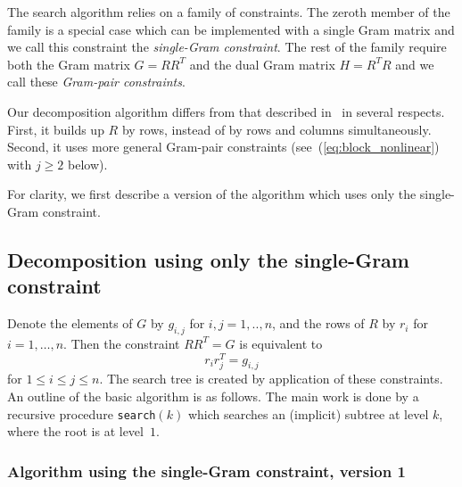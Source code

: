 \documentclass[11pt,a4paper]{article}
\begin{document}
The search algorithm relies on a family of constraints. The zeroth member
of the family is a special case which can be implemented with a single Gram
matrix and we call this constraint the \emph{single-Gram constraint}. The
rest of the family require both the Gram matrix $G=RR^T$ and the dual Gram
matrix $H=R^TR$ and we call these \emph{Gram-pair constraints}.

Our decomposition algorithm differs from that described in~\cite{Orrick05}
in several respects.  First, it builds up $R$ by rows, instead of by rows
and columns simultaneously.  Second, it uses more general Gram-pair
constraints (see~(\ref{eq:block_nonlinear}) with $j \ge 2$ below).

For clarity, we first describe a version of the algorithm which
uses only the single-Gram constraint.

\subsection{Decomposition using only the single-Gram constraint}
\label{subsec:linear}


Denote the elements of $G$ by $g_{i,j}$ for $i,j =1,..,n$,  
and the rows of $R$ by $r_i$ for $i=1,\ldots,n$. %
Then the constraint $RR^T = G$ is equivalent to
\begin{equation}
r_i r_j^T = g_{i,j}				\label{eq:gij_constraint}
\end{equation}
for $1 \le i \le j \le n$.  The search tree is created by application of
these constraints.  
An outline of the basic algorithm is as follows. The main work is
done by a recursive procedure {\tt search}$(k)$ which searches 
an (implicit) subtree at level $k$, where the root is at level~$1$.

\newpage

\subsubsection*{Algorithm using the single-Gram constraint, version 1}
\end{document}
